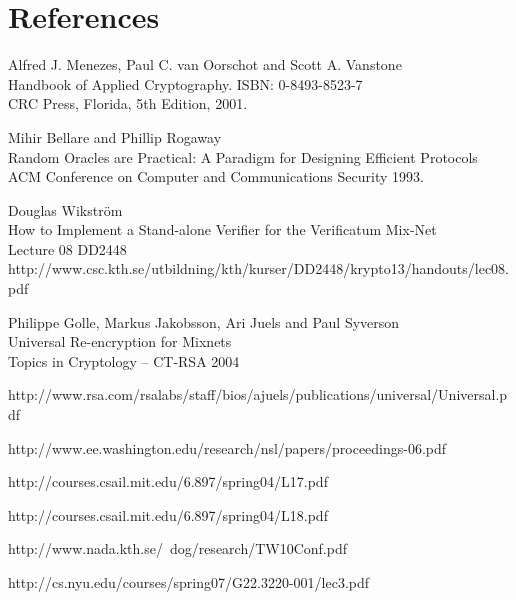 \section{References}

\begin{thebibliography}{9}

  Alfred J. Menezes, Paul C. van Oorschot and Scott A. Vanstone\\
  Handbook of Applied Cryptography.
  ISBN: 0-8493-8523-7\\
  CRC Press, Florida,
  5th Edition,
  2001.

   Mihir Bellare and Phillip Rogaway\\
   Random Oracles are Practical: A Paradigm for Designing Efficient Protocols\\
   ACM Conference on Computer and Communications Security 1993.

   Douglas Wikström\\
   How to Implement a Stand-alone Verifier for the Verificatum Mix-Net\\

  Lecture 08 DD2448
  http://www.csc.kth.se/utbildning/kth/kurser/DD2448/krypto13/handouts/lec08.pdf

   Philippe Golle, Markus Jakobsson, Ari Juels and Paul Syverson\\
   Universal Re-encryption for Mixnets\\
   Topics in Cryptology – CT-RSA 2004

   http://www.rsa.com/rsalabs/staff/bios/ajuels/publications/universal/Universal.pdf


http://www.ee.washington.edu/research/nsl/papers/proceedings-06.pdf

  http://courses.csail.mit.edu/6.897/spring04/L17.pdf

  http://courses.csail.mit.edu/6.897/spring04/L18.pdf

http://www.nada.kth.se/~dog/research/TW10Conf.pdf

http://cs.nyu.edu/courses/spring07/G22.3220-001/lec3.pdf


\end{thebibliography}
